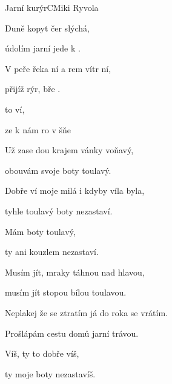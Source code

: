 \begin{song}{Jarní kurýr}{C}{Miki Ryvola}

\begin{SBVerse}

Duně kopyt čer slýchá,

údolím jarní  jede k .

V peře řeka ní a rem vítr ní,

přijíž rýr, bře  .

\end{SBVerse}

\begin{SBChorus}

  to ví,

ze k nám ro v šňe 

\end{SBChorus}

\begin{SBVerse}

Už zase dou krajem vánky voňavý,

obouvám svoje boty toulavý.

Dobře ví moje milá i kdyby víla byla,

tyhle toulavý boty nezastaví.

\end{SBVerse}

\begin{SBChorus}

Mám boty toulavý,

ty ani kouzlem nezastaví.

\end{SBChorus}

\begin{SBVerse}

Musím jít, mraky táhnou nad hlavou,

musím jít stopou bílou toulavou.

Neplakej že se ztratím já do roka se vrátím.

Prošlápám cestu domů jarní trávou.

\end{SBVerse}

\begin{SBChorus}

Víš, ty to dobře víš,

ty moje boty nezastavíš.

\end{SBChorus}

\end{song}

\clearpage
